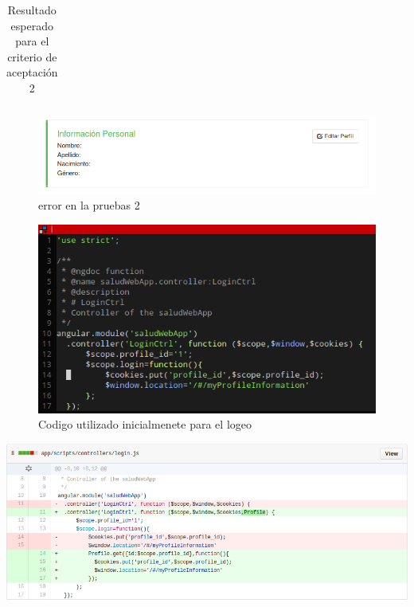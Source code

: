 {{\begin{table}[h]
\begin{longtable}{|l|p{10cm}|}
	    \end{longtable}
        \caption{Resultado esperado para el criterio de aceptación 2}
    	\end{table}
	}
    
\begin{figure}[h]
  \centering
  \includegraphics[width=.8\textwidth]{img/tp1_parte2/1-prueba_2}
  \caption{error en la pruebas 2}
  \label{prueba2}
\end{figure}

\begin{figure}[h]
  \centering
  \includegraphics[width=.8\textwidth]{img/tp1_parte2/1-codigo_prueba_2}
  \caption{Codigo utilizado inicialmenete para el logeo}
  \label{Codigoinicialprueba2}
\end{figure}


\begin{correccionFigure}[h]
  \centering
  \includegraphics[width=.8\textwidth]{img/tp1_parte2/1-correccion_prueba_2}
  \caption{Correcciones de los error detectados en la pruebas 2}
  \label{correccionprueba2}
\end{correccionFigure}

\clearpage

}
